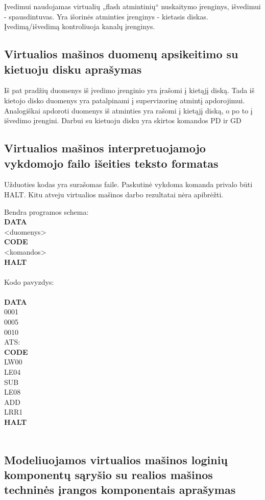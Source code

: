 Įvedimui naudojamas virtualių „flash atmintinių“ nuskaitymo įrenginys, išvedimui - spausdintuvas. Yra išorinės atminties įrenginys - kietasis diskas. Įvedimą/išvedimą kontroliuoja kanalų įrenginys.

\subsection{Virtualios mašinos duomenų apsikeitimo su kietuoju disku aprašymas}

Iš pat pradžių duomenys iš įvedimo įrenginio yra įrašomi į kietąjį diską. Tada iš kietojo disko duomenys yra patalpinami į supervizorinę atmintį apdorojimui. 
Analogiškai apdoroti duomenys iš atminties yra rašomi į kietąjį diską, o po to į išvedimo įrengini.
Darbui su kietuoju disku yra skirtos komandos PD ir GD

\subsection{Virtualios mašinos interpretuojamojo vykdomojo failo išeities 
teksto formatas}

Užduoties kodas yra surašomas faile. Paskutinė vykdoma komanda privalo būti HALT. Kitu atveju virtualios mašinos darbo
rezultatai nėra apibrėžti.

Bendra programos schema:\\
\textbf{DATA}\\
<duomenys>\\
\textbf{CODE}\\
<komandos>\\
\textbf{HALT}\\
\\
Kodo pavyzdys:\\
\\\textbf{DATA}\\
0001\\
0005\\
0010\\
ATS:\\
\textbf{CODE}\\
LW00\\
LE04\\
SUB \\
LE08\\
ADD \\
LRR1\\
\textbf{HALT}\\
\\

\subsection{Modeliuojamos virtualios mašinos loginių komponentų sąryšio su 
realios mašinos techninės įrangos komponentais aprašymas}

